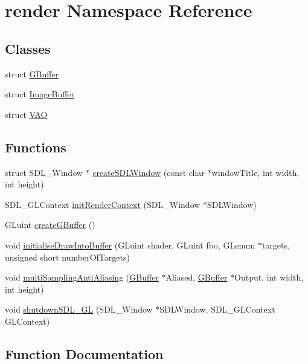 \hypertarget{namespacerender}{}\section{render Namespace Reference}
\label{namespacerender}
\subsection*{Classes}
\begin{DoxyCompactItemize}
\item 
struct \hyperlink{structrender_1_1_g_buffer}{G\+Buffer}
\item 
struct \hyperlink{structrender_1_1_image_buffer}{Image\+Buffer}
\item 
struct \hyperlink{structrender_1_1_v_a_o}{V\+AO}
\end{DoxyCompactItemize}
\subsection*{Functions}
\begin{DoxyCompactItemize}
\item 
struct S\+D\+L\+\_\+\+Window $\ast$ \hyperlink{namespacerender_a55661bb17cf99c9a3441cd9d2e95d0cf}{create\+S\+D\+L\+Window} (const char $\ast$window\+Title, int width, int height)
\item 
S\+D\+L\+\_\+\+G\+L\+Context \hyperlink{namespacerender_aeae3fa52815ab18237e4c3e405c09a7f}{init\+Render\+Context} (S\+D\+L\+\_\+\+Window $\ast$S\+D\+L\+Window)
\item 
G\+Luint \hyperlink{namespacerender_a93740d5f44bb6ecfc6a1254fae6ca64b}{create\+G\+Buffer} ()
\item 
void \hyperlink{namespacerender_a62ca039dacf6eef4eb7e20393beaa9b9}{initialise\+Draw\+Into\+Buffer} (G\+Luint shader, G\+Luint fbo, G\+Lenum $\ast$targets, unsigned short number\+Of\+Targets)
\item 
void \hyperlink{namespacerender_a586caba2014526d655ab3465600c06b7}{multi\+Sampling\+Anti\+Aliasing} (\hyperlink{structrender_1_1_g_buffer}{G\+Buffer} $\ast$Aliased, \hyperlink{structrender_1_1_g_buffer}{G\+Buffer} $\ast$Output, int width, int height)
\item 
void \hyperlink{namespacerender_af1c9c55aba9e32597ee0ed743de32a5d}{shutdown\+S\+D\+L\+\_\+\+GL} (S\+D\+L\+\_\+\+Window $\ast$S\+D\+L\+Window, S\+D\+L\+\_\+\+G\+L\+Context G\+L\+Context)
\end{DoxyCompactItemize}


\subsection{Function Documentation}
